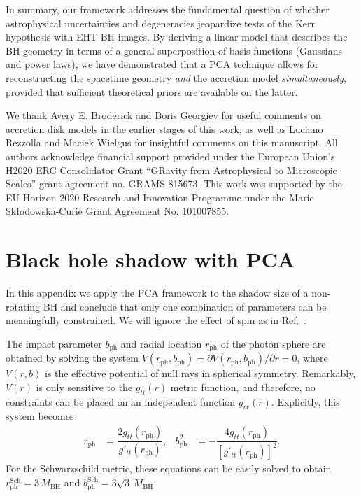 \documentclass[%
nofootinbib,
 amsmath,amssymb,
 aps,
floatfix,
twocolumn
]{revtex4-2}
\begin{document}
In summary, our framework addresses the fundamental question of whether astrophysical uncertainties and degeneracies jeopardize tests of the Kerr hypothesis with EHT BH images.
 By deriving a linear model that describes the BH geometry in terms of a  general superposition of basis functions (Gaussians and power laws), we have demonstrated that a PCA technique
allows for reconstructing the spacetime geometry {\it and} the accretion model {\it simultaneously}, provided that sufficient theoretical priors are available on the latter. 

\acknowledgments
We thank Avery E. Broderick and Boris Georgiev for useful comments on accretion disk models in the earlier stages of this work, as well as Luciano Rezzolla and Maciek Wielgus for insightful comments on this manuscript. All authors acknowledge financial support provided under the European Union's H2020 ERC Consolidator Grant ``GRavity from Astrophysical to Microscopic Scales'' grant agreement no. GRAMS-815673. This work was supported by the EU Horizon 2020 Research and Innovation Programme under the Marie Skłodowska-Curie Grant Agreement No. 101007855.

\appendix

\section{Black hole shadow with PCA} \label{sec: PCAShadow}

In this appendix we apply the PCA framework to the shadow size of a non-rotating BH and conclude that only one combination of parameters can be meaningfully constrained. We will ignore the effect of spin as in Ref.~\cite{Kocherlakota:2021dcv}.

The impact parameter \(b_\text{ph}\) and radial location \(r_\text{ph}\) of the photon sphere are obtained by solving the system \(V\left(r_\text{ph}, b_\text{ph}\right) = \partial V\left(r_\text{ph}, b_\text{ph}\right)/\partial r = 0\), where \(V(r, b)\) is the effective potential of null rays in spherical symmetry. Remarkably, \(V(r)\) is only sensitive to the \(g_{tt}(r)\) metric function, and therefore, no constraints can be placed on an independent function \(g_{rr}(r)\). Explicitly, this system becomes \cite{Volkel:2020xlc} 
%
\begin{align}\label{eq: system2}
    r_\text{ph} &= \dfrac{2 g_{tt}(r_\text{ph})}{g'_{tt}(r_\text{ph})} , &
    b_\text{ph}^2 & = - \dfrac{4 g_{tt}(r_\text{ph})}{\left[g'_{tt}(r_\text{ph})\right]^2}    .
\end{align}
%
For the Schwarzschild metric, these equations can be easily solved to obtain \(r_\text{ph}^\text{Sch} = 3 \, M_\text{BH}\) and \(b_\text{ph}^\text{Sch} = 3\sqrt{3} \, M_\text{BH} \).
\end{document}
